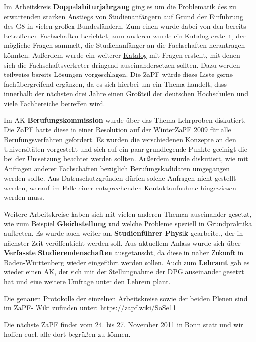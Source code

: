 \documentclass{scrartcl}
\begin{document}
Im Arbeitskreis \textbf{Doppelabiturjahrgang} ging es um die Problematik des zu erwartenden starken Anstiegs von
Studienanfängern auf Grund der Einführung des G8 in vielen großen Bundesländern. Zum einen wurde dabei von den bereits
betroffenen Fachschaften berichtet, zum anderen wurde ein
\href{https://zapf.wiki/Doppeljahrgang}{Katalog} erstellt, der mögliche Fragen sammelt, die
Studienanfänger an die Fachschaften herantragen könnten. Außerdem wurde ein weiterer
\href{https://zapf.wiki/Doppeljahrgang}{Katalog} mit Fragen erstellt, mit denen sich die
Fachschaftsvertreter dringend auseinandersetzen sollten. Dazu werden teilweise bereits Lösungen vorgeschlagen. Die ZaPF
würde diese Liste gerne fachübergreifend ergänzen, da es sich hierbei um ein Thema handelt, dass innerhalb der nächsten
drei Jahre einen Großteil der deutschen Hochschulen und viele Fachbereiche betreffen wird.



Im AK \textbf{Berufungskommission} wurde über das Thema Lehrproben diskutiert. Die ZaPF hatte diese in einer
Resolution auf der WinterZaPF 2009 für alle Berufungsverfahren gefordert. Es
wurden die verschiedenen Konzepte an den Universitäten vorgestellt und sich auf ein paar grundlegende Punkte
geeinigt die bei der Umsetzung beachtet werden sollten. Außerdem wurde diskutiert, wie mit Anfragen anderer
Fachschaften bezüglich Berufungskadidaten umgegangen werden sollte. Aus Datenschutzgründen dürfen solche Anfragen
nicht gestellt werden, worauf im Falle einer entsprechenden Kontaktaufnahme hingewiesen werden muss.

Weitere Arbeitskreise haben sich mit vielen anderen Themen auseinander gesetzt, wie zum Beispiel
\textbf{Gleichstellung} und welche Probleme speziell in Grundpraktika auftreten. Es wurde auch weiter am
\textbf{Studienführer Physik} gearbeitet, der in nächster Zeit veröffentlicht werden soll. Aus aktuellem Anlass wurde
sich über \textbf{Verfasste Studierendenschaften} ausgetauscht, da diese in naher Zukunft in Baden-Württenberg wieder
eingeführt werden sollen. Auch zum \textbf{Lehramt} gab es wieder einen AK, der sich mit der Stellungnahme der DPG
auseinander gesetzt hat und eine weitere Umfrage unter den Lehrern plant.

Die genauen Protokolle der einzelnen Arbeitskreise sowie der beiden Plenen sind im ZaPF-
Wiki zufinden unter: \url{https://zapf.wiki/SoSe11}

\vspace{0.5cm}
Die nächste ZaPF findet vom 24. bis 27. November 2011 in \href{http://zapfibo.de}{Bonn} statt und wir hoffen euch alle
dort begrüßen zu können. 
\end{document}
